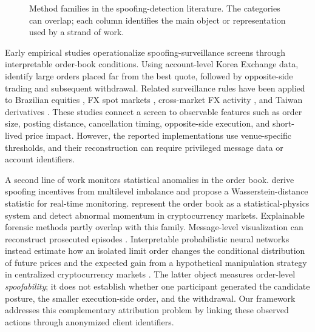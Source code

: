 \documentclass[11pt]{article}
\begin{document}
\begin{figure}[htbp]
    \caption{Method families in the spoofing-detection literature. The categories can overlap; each column identifies
    the main object or representation used by a strand of work.}
    \label{fig:method_taxonomy}
\end{figure}

Early empirical studies operationalize spoofing-surveillance screens through interpretable order-book conditions. Using account-level Korea Exchange
data, \cite{LeeEomPark2013} identify large orders placed far from the best quote, followed by opposite-side trading and
subsequent withdrawal. Related surveillance rules have been applied to Brazilian equities
\cite{MendoncaDeGenaro2020}, FX spot markets \cite{StenforsSusai2021}, cross-market FX activity
\cite{StenforsEtAl2023}, and Taiwan derivatives \cite{ChenHsiehYang2026}. These studies connect a screen to observable
features such as order size, posting distance, cancellation timing, opposite-side execution, and short-lived price
impact. However, the reported implementations use venue-specific thresholds, and their reconstruction can require
privileged message data or account identifiers.

A second line of work monitors statistical anomalies in the order book. \cite{TaoDayLingDrapeau2022} derive spoofing
incentives from multilevel imbalance and propose a Wasserstein-distance statistic for real-time monitoring.
\cite{LiPolukarovaVentre2023} represent the order book as a statistical-physics system and detect abnormal momentum in
cryptocurrency markets. Explainable forensic methods partly overlap with this family. Message-level visualization can
reconstruct prosecuted episodes \cite{DebieEtAl2023}. Interpretable probabilistic neural networks instead estimate how an
isolated limit order changes the conditional distribution of future prices and the expected gain from a hypothetical
manipulation strategy in centralized cryptocurrency markets \cite{FabreChallet2025}. The latter object measures
order-level \emph{spoofability}; it does not establish whether one participant generated the candidate posture, the
smaller execution-side order, and the withdrawal. Our framework addresses this complementary attribution problem by
linking these observed actions through anonymized client identifiers.
\end{document}
